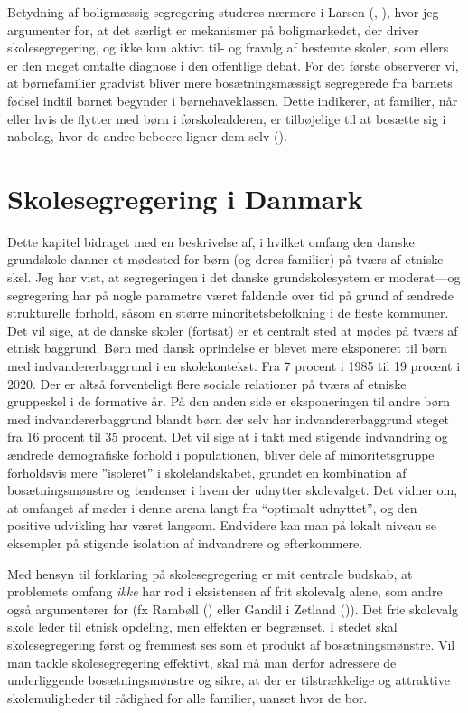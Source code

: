 \documentclass[
]{book}
\begin{document}
Betydning af boligmæssig segregering studeres nærmere i Larsen (, ), hvor jeg argumenter for, at det særligt er mekanismer på boligmarkedet, der driver skolesegregering, og ikke kun aktivt til- og fravalg af bestemte skoler, som ellers er den meget omtalte diagnose i den offentlige debat. For det første observerer vi, at børnefamilier gradvist bliver mere bosætningsmæssigt segregerede fra barnets fødsel indtil barnet begynder i børnehaveklassen. Dette indikerer, at familier, når eller hvis de flytter med børn i førskolealderen, er tilbøjelige til at bosætte sig i nabolag, hvor de andre beboere ligner dem selv ().

\newpage

\section{Skolesegregering i Danmark}\label{skolesegregering-i-danmark}

Dette kapitel bidraget med en beskrivelse af, i hvilket omfang den danske grundskole danner et mødested for børn (og deres familier) på tværs af etniske skel. Jeg har vist, at segregeringen i det danske grundskolesystem er moderat---og segregering har på nogle parametre været faldende over tid på grund af ændrede strukturelle forhold, såsom en større minoritetsbefolkning i de fleste kommuner. Det vil sige, at de danske skoler (fortsat) er et centralt sted at mødes på tværs af etnisk baggrund. Børn med dansk oprindelse er blevet mere eksponeret til børn med indvandererbaggrund i en skolekontekst. Fra 7 procent i 1985 til 19 procent i 2020. Der er altså forventeligt flere sociale relationer på tværs af etniske gruppeskel i de formative år. På den anden side er eksponeringen til andre børn med indvandererbaggrund blandt børn der selv har indvandererbaggrund steget fra 16 procent til 35 procent. Det vil sige at i takt med stigende indvandring og ændrede demografiske forhold i populationen, bliver dele af minoritetsgruppe forholdsvis mere ''isoleret'' i skolelandskabet, grundet en kombination af bosætningsmønstre og tendenser i hvem der udnytter skolevalget. Det vidner om, at omfanget af møder i denne arena langt fra ``optimalt udnyttet'', og den positive udvikling har været langsom. Endvidere kan man på lokalt niveau se eksempler på stigende isolation af indvandrere og efterkommere.

Med hensyn til forklaring på skolesegregering er mit centrale budskab, at problemets omfang \emph{ikke} har rod i eksistensen af frit skolevalg alene, som andre også argumenterer for (fx Rambøll () eller Gandil i Zetland ()). Det frie skolevalg skole leder til etnisk opdeling, men effekten er begrænset. I stedet skal skolesegregering først og fremmest ses som et produkt af bosætningsmønstre. Vil man tackle skolesegregering effektivt, skal må man derfor adressere de underliggende bosætningsmønstre og sikre, at der er tilstrækkelige og attraktive skolemuligheder til rådighed for alle familier, uanset hvor de bor.
\end{document}
